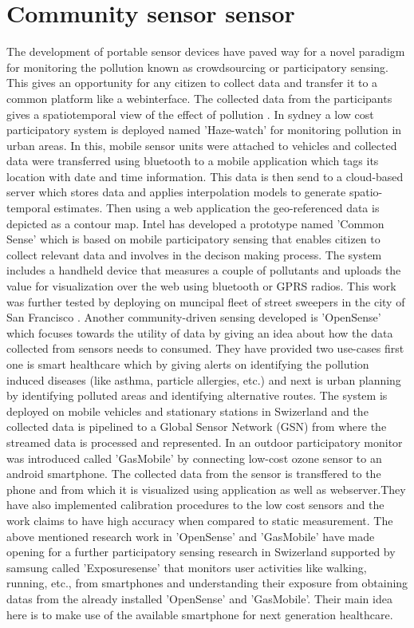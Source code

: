 \section{Community sensor sensor}

The development of portable sensor devices have paved way for a novel paradigm for monitoring the pollution known as crowdsourcing or participatory sensing. This gives an opportunity for any citizen to collect data and transfer it to a common platform like a webinterface. The collected data  from the participants gives a spatiotemporal view of the effect of pollution \cite{Kanhere2013}. In sydney a low cost participatory system is deployed named 'Haze-watch' \cite{Sivaraman2013} for monitoring pollution in urban areas. In this, mobile sensor units were attached to vehicles and collected data were transferred using bluetooth to a mobile application which tags its location with date and time information. This data is then send to a cloud-based server which stores data and applies interpolation models \cite{Liao2006} to generate spatio-temporal estimates. Then using a web application the geo-referenced data is depicted as a contour map. 
Intel has developed a prototype named 'Common Sense' \cite{Dutta2009} which is based on mobile participatory sensing \cite{Abdelzaher2007} that enables citizen to collect relevant data and involves in the decison making process. The system includes a handheld device that measures a couple of pollutants and uploads the value for visualization over the web using bluetooth or GPRS radios. This work was further tested by deploying on muncipal fleet of street sweepers in the city of San Francisco \cite{Aoki2008}. Another community-driven sensing developed is 'OpenSense' \cite{Aberer2010} which focuses towards the utility of data by giving an idea about how the data collected from sensors needs to consumed. They have provided two use-cases first one is smart healthcare which by giving alerts on identifying the pollution induced diseases (like asthma, particle allergies, etc.) and next is urban planning by identifying polluted areas and identifying alternative routes. The system is deployed on mobile vehicles and stationary stations in Swizerland and the collected data is pipelined to a Global Sensor Network (GSN) from where the streamed data is processed and represented. In \cite{Hasenfratz2012} an outdoor participatory monitor was introduced called 'GasMobile' by connecting low-cost ozone sensor to an android smartphone. The collected data from the sensor is transffered to the phone and from which it is visualized using application as well as webserver.They have also implemented calibration procedures to the low cost sensors and the work claims to have high accuracy when compared to static measurement. The above mentioned research work in 'OpenSense' and 'GasMobile' have made opening for a further participatory sensing research in Swizerland supported by samsung called 'Exposuresense' \cite{Predic2013} that monitors user activities like walking, running, etc., from smartphones and understanding their exposure from obtaining datas from the already installed 'OpenSense' and 'GasMobile'. Their main idea here is to make use of the available smartphone for next generation healthcare.
